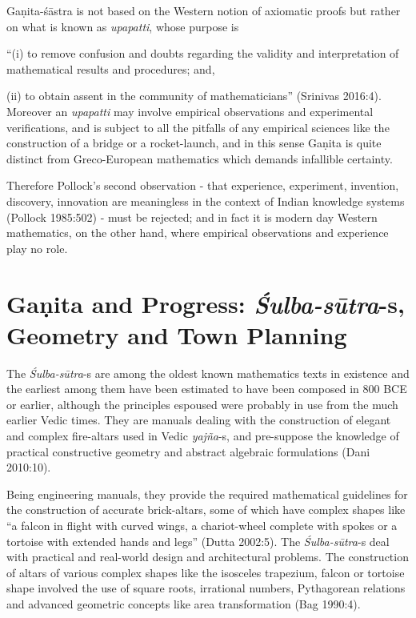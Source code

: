 Gaṇita-śāstra is not based on the Western notion of axiomatic proofs but rather on what is known as {\sl upapatti}, whose purpose is 

``(i) to remove confusion and doubts regarding the validity and interpretation of mathematical results and procedures; and, 

(ii) to obtain assent in the community of mathematicians'' (Srinivas 2016:4). Moreover an {\sl upapatti} may involve empirical observations and experimental verifications, and is subject to all the pitfalls of any empirical sciences like the construction of a bridge or a rocket-launch, and in this sense Gaṇita is quite distinct from Greco-European mathematics which demands infallible certainty.

Therefore Pollock's second observation - that experience, experiment, invention, discovery, innovation are meaningless in the context of Indian knowledge systems (Pollock 1985:502) - must be rejected; and in fact it is modern day Western mathematics, on the other hand, where empirical observations and experience play no role.

\section*{Gaṇita and Progress: {\sl\bfseries Śulba-sūtra}-s, Geometry and Town Planning}

The {\sl Śulba-sūtra}-s are among the oldest known mathematics texts in existence and the earliest among them have been estimated to have been composed in 800 BCE or earlier, although the principles espoused were probably in use from the much earlier Vedic times. They are manuals dealing with the construction of elegant and complex fire-altars used in Vedic {\sl yajña}-s, and pre-suppose the knowledge of practical constructive geometry and abstract algebraic formulations (Dani 2010:10). 

Being engineering manuals, they provide the required mathematical guidelines for the construction of accurate brick-altars, some of which have complex shapes like ``a falcon in flight with curved wings, a chariot-wheel complete with spokes or a tortoise with extended hands and legs'' (Dutta 2002:5). The {\sl Śulba-sūtra}-s deal with practical and real-world design and architectural problems. The construction of altars of various complex shapes like the isosceles trapezium, falcon or tortoise shape involved the use of square roots, irrational numbers, Pythagorean relations and advanced geometric concepts like area transformation (Bag 1990:4).

